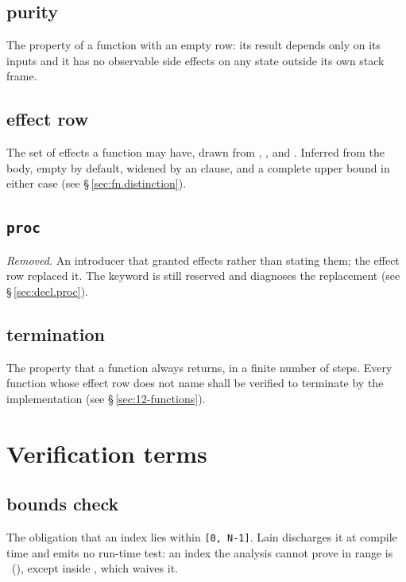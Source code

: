 \subsection*{purity}
The property of a function with an empty row: its result depends only on its inputs and it
has no observable side effects on any state outside its own stack frame.

\subsection*{effect row}
The set of effects a function may have, drawn from , ,
 and .  Inferred from the body, empty by default, widened
by an  clause, and a complete upper bound in either case
(see \S\,\ref{sec:fn.distinction}).

\subsection*{\texttt{proc}}
\emph{Removed.}  An introducer that granted effects rather than stating them; the
effect row replaced it.  The keyword is still reserved and diagnoses the
replacement (see \S\,\ref{sec:decl.proc}).

\subsection*{termination}
The property that a function always returns, in a finite number of steps.  Every
function whose effect row does not name  shall be verified to terminate
by the implementation (see \S\,\ref{sec:12-functions}).

\section{Verification terms}
\label{sec:terms.verification}

\subsection*{bounds check}
The obligation that an index lies within \texttt{[0, N-1]}.  Lain discharges it at
compile time and emits no run-time test: an index the analysis cannot prove in range is
\illformed{}~(), except inside , which waives it.

